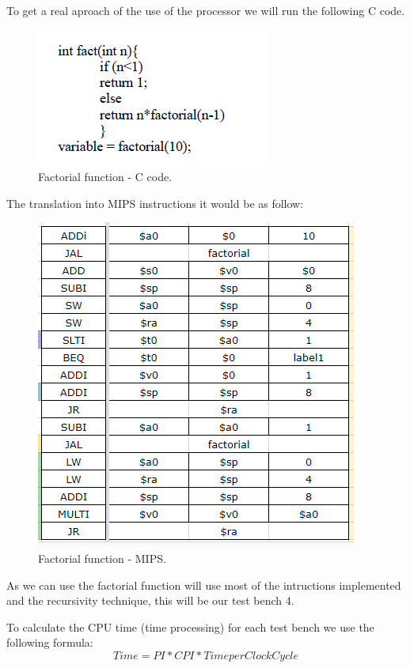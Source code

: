 \documentclass[conference]{IEEEtran}
\begin{document}
To get a real aproach of the use of the processor we will run the following C code.
\begin{figure}[h]
\begin{center}
\includegraphics[scale=0.8]{factorial_c.png}
\caption{Factorial function - C code.}
\label{fact_c}
\end{center}
\end{figure}

The translation into MIPS instructions it would be as follow:
\begin{figure}[h]
\begin{center}
\includegraphics[scale=0.55]{factorial_mips.png}
\caption{Factorial function - MIPS.}
\label{fact_mips}
\end{center}
\end{figure}
 
As we can use the factorial function will use most of the intructions implemented and the recursivity
technique, this will be our test bench 4.

To calculate the CPU time \cite{b5} (time processing) for each test bench we use the following formula:
\[Time = PI * CPI * Time per Clock Cycle\] 
\end{document}
